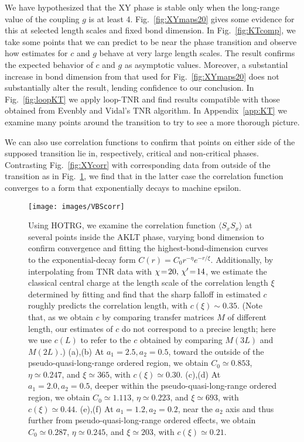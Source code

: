 \documentclass[aps,prb,letterpaper,superscriptaddress,twocolumn,showpacs,floatfix,10pt]{revtex4-1}
\begin{document}
We have hypothesized that the XY phase is stable only when the long-range
value of the coupling $g$ is at least 4. Fig.~\ref{fig:XYmaps20} gives some
evidence for this at selected length scales and fixed bond dimension. In
Fig.~\ref{fig:KTcomp}, we take some points that we can predict to be near
the phase transition and observe how estimates for $c$ and $g$ behave at very
large length scales. The result confirms the expected behavior of $c$ and $g$ as
asymptotic values. Moreover, a substantial increase in bond dimension from that
used for Fig.~\ref{fig:XYmaps20} does not substantially alter the result,
lending confidence to our conclusion. In Fig.~\ref{fig:loopKT} we apply
loop-TNR and find results compatible with those obtained from
Evenbly and Vidal's TNR algorithm.
In Appendix~\ref{app:KT} we examine many points around the
transition to try to see a more thorough picture.

We can also use correlation functions to confirm that points on either side of
the supposed transition lie in, respectively, critical and non-critical phases.
Contrasting Fig.~\ref{fig:XYcorr} with
corresponding data from outside of the transition as in Fig.~\ref{fig:VBScorr},
we find that in the latter case the correlation function converges to a form
that exponentially decays to machine epsilon.

\begin{figure}[h!]
\texttt{[image: images/VBScorr]}
\caption{Using HOTRG, we examine the correlation function
$\langle S_xS_x\rangle$ at several points inside the AKLT phase, varying
bond dimension to confirm convergence and fitting the highest-bond-dimension
curves to the exponential-decay form $C(r) = C_0 r^{-\eta}e^{-r/\xi}$.
Additionally, by interpolating from TNR data with $\chi\nobreak\!=\nobreak\!20, \,\chi'\nobreak\!=\nobreak\!14$, we
estimate the classical central charge at the length scale of the
correlation length $\xi$ determined by fitting and find
that the sharp falloff in estimated $c$ roughly predicts the correlation
length, with $c(\xi) \sim 0.35$. (Note that, as we obtain $c$ by comparing
transfer matrices $M$ of different length, our estimates of $c$ do not
correspond to a precise length; here we use $c(L)$ to refer to the $c$
obtained by comparing $M(3L)$ and $M(2L)$.)
(a),(b) At $a_1=2.5,a_2=0.5$, toward the outside of the pseudo-quasi-long-range
ordered region, we obtain $C_0 \simeq 0.853$, $\eta \simeq 0.247$,
and $\xi \simeq 365$, with $c(\xi) \simeq 0.30$.
(c),(d) At $a_1=2.0,a_2=0.5$, deeper within the pseudo-quasi-long-range ordered
region, we obtain $C_0 \simeq 1.113$, $\eta \simeq 0.223$,
and $\xi \simeq 693$, with $c(\xi) \simeq 0.44$.
(e),(f) At $a_1=1.2,a_2=0.2$, near the $a_2$ axis and thus further from
pseudo-quasi-long-range ordered effects,
we obtain $C_0 \simeq 0.287$, $\eta \simeq 0.245$,
and $\xi \simeq 203$, with $c(\xi) \simeq 0.21$.
}
\label{fig:VBScorr}
\end{figure}
\end{document}
